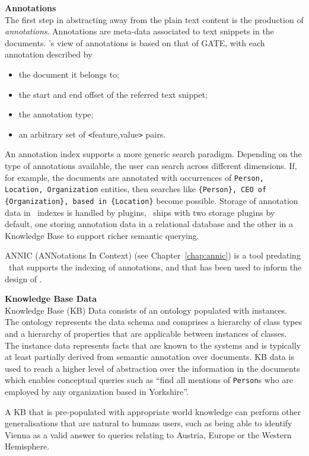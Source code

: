 {\bf Annotations}\\
The first step in abstracting away from the plain text content is the
production of {\em annotations}. Annotations are meta-data associated to text
snippets in the documents. \Mimir's view of annotations is based on that of
GATE, with each annotation described by
\begin{itemize}
  \item the document it belongs to;
  \item the start and end offset of the referred text snippet;
  \item the annotation type;
  \item an arbitrary set of \verb!<!feature,value\verb!>! pairs.
\end{itemize}

An annotation index supports a more generic search paradigm. Depending on the
type of annotations available, the user can search across different dimensions.
If, for example, the documents are annotated with occurrences of {\tt Person,
Location, Organization} entities, then searches like {\tt \{Person\}, CEO of
\{Organization\}, based in \{Location\}} become possible.  Storage of
annotation data in \Mimir\ indexes is handled by plugins, \Mimir\ ships with
two storage plugins by default, one storing annotation data in a relational
database and the other in a Knowledge Base to support richer semantic querying.

ANNIC (ANNotations In
Context) (see Chapter~\ref{chap:annic}) is a tool
predating \Mimir\ that supports the indexing of annotations, and that has been
used to inform the design of \Mimir.

{\bf Knowledge Base Data}\\
Knowledge Base (KB) Data  consists of an ontology populated with instances. The
ontology represents the data schema and comprises a hierarchy of class types
and a hierarchy of properties that are applicable between instances of classes.
The instance data represents facts that are known to the systems and is
typically at least partially derived from semantic annotation over documents.
KB data is used to reach a higher level of abstraction over the information in
the documents which enables conceptual queries such as ``find all mentions of
{\tt Person}s who are employed by any organization based in Yorkshire''.

A KB that is pre-populated with appropriate world knowledge can perform other
generalisations that are natural to humans users, such as being able to identify
Vienna as a valid answer to queries relating to Austria, Europe or the Western
Hemisphere.

